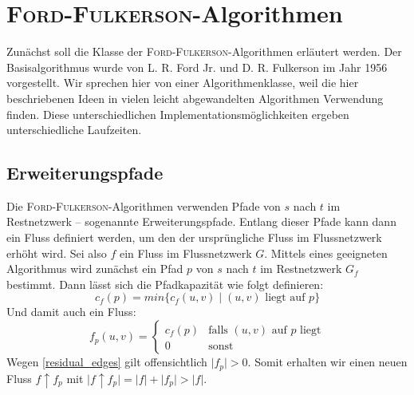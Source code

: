 \documentclass[12pt,a4paper,titlepage,onecolumn,ngerman,bibliography=totocnumbered]{scrartcl}
\theoremstyle{definition}
\theoremstyle{remark}
\newcommand{\ff}{\textsc{Ford-Fulkerson}}
\begin{document}
\section{\ff -Algorithmen}
Zunächst soll die Klasse der \ff -Algorithmen erläutert werden.
Der Basisalgorithmus wurde von L. R. Ford Jr. und D. R. Fulkerson im Jahr 1956 vorgestellt.
Wir sprechen hier von einer Algorithmenklasse, weil die hier beschriebenen Ideen in vielen leicht abgewandelten Algorithmen Verwendung finden.
Diese unterschiedlichen Implementationsmöglichkeiten ergeben unterschiedliche Laufzeiten.

\subsection{Erweiterungspfade}
Die \ff -Algorithmen verwenden Pfade von $s$ nach $t$ im Restnetzwerk -- sogenannte Erweiterungspfade.
Entlang dieser Pfade kann dann ein Fluss definiert werden, um den der ursprüngliche Fluss im Flussnetzwerk erhöht wird.
\medbreak
Sei also $f$ ein Fluss im Flussnetzwerk $G$.
Mittels eines geeigneten Algorithmus wird zunächst ein Pfad $p$ von $s$ nach $t$ im Restnetzwerk $G_f$ bestimmt.
Dann lässt sich die Pfadkapazität wie folgt definieren:
\begin{equation}
	c_f(p) = min\{ c_f(u,v)\mid (u,v) \text{ liegt auf $p$}\}
\end{equation}
\medbreak
Und damit auch ein Fluss:
\begin{equation}
	f_p(u,v) = \begin{cases}c_f(p) & \text{falls $(u,v)$ auf $p$ liegt}\\0 & \text{sonst}\end{cases}
\end{equation}
\medbreak
Wegen \eqref{residual_edges} gilt offensichtlich $\lvert f_p\rvert > 0$.
Somit erhalten wir einen neuen Fluss $f\uparrow f_p$ mit $\lvert f\uparrow f_p \rvert = \lvert f \rvert + \lvert f_p\rvert > \lvert f\rvert$. %
\end{document}
